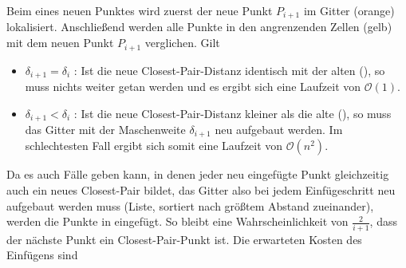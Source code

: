 \documentclass{scrartcl}%
\begin{document}
    \begin{figure}[H]
        \centering
        \begin{table}[H]
            \centering
        \end{table}
    \end{figure}

    Beim  eines neuen Punktes wird zuerst der neue Punkt $P_{i+1}$ im Gitter (orange) lokalisiert.
    Anschließend werden alle Punkte in den angrenzenden Zellen (gelb)
    mit dem neuen Punkt $P_{i+1}$ verglichen. Gilt

    \begin{itemize}
        \item $\delta_{i+1} = \delta_i $ : Ist die neue Closest-Pair-Distanz identisch mit der alten
        (), so muss nichts weiter getan werden
        und es ergibt sich eine Laufzeit von $\mathcal{O}(1)$.
        \item $\delta_{i+1} < \delta_i $ : Ist die neue Closest-Pair-Distanz
        kleiner als die alte (),
        so muss das Gitter mit der Maschenweite $\delta_{i+1}$ neu aufgebaut werden.
        Im schlechtesten Fall ergibt sich somit eine Laufzeit von $\mathcal{O}(n^2)$.
    \end{itemize}

    Da es auch Fälle geben kann, in denen jeder neu eingefügte Punkt gleichzeitig auch ein neues Closest-Pair bildet,
    das Gitter also bei jedem Einfügeschritt neu aufgebaut werden muss (Liste, sortiert nach größtem Abstand zueinander),
    werden die Punkte in  eingefügt.
    So bleibt eine Wahrscheinlichkeit von $\frac{2}{i+1}$, dass der nächste Punkt ein Closest-Pair-Punkt ist.
    Die erwarteten Kosten des Einfügens  sind
\end{document}
